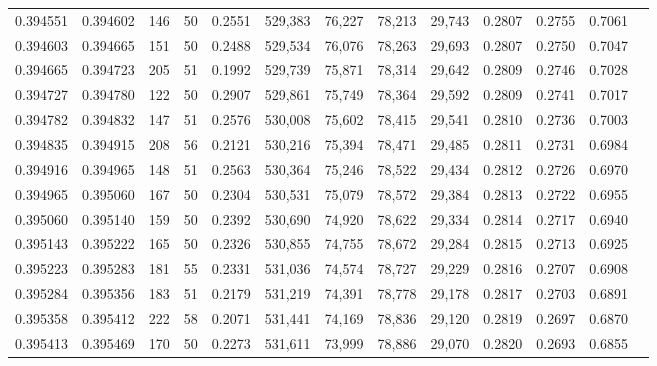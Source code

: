 \begin{tabular}{rrrrrrrrrrrrr}
0.394551 & 0.394602 &   146 &  50 &                                     0.2551 & 529,383 &  76,227 &  78,213 &  29,743 & 0.2807 & 0.2755 & 0.7061 \\
0.394603 & 0.394665 &   151 &  50 &                                     0.2488 & 529,534 &  76,076 &  78,263 &  29,693 & 0.2807 & 0.2750 & 0.7047 \\
0.394665 & 0.394723 &   205 &  51 &                                     0.1992 & 529,739 &  75,871 &  78,314 &  29,642 & 0.2809 & 0.2746 & 0.7028 \\
0.394727 & 0.394780 &   122 &  50 &                                     0.2907 & 529,861 &  75,749 &  78,364 &  29,592 & 0.2809 & 0.2741 & 0.7017 \\
0.394782 & 0.394832 &   147 &  51 &                                     0.2576 & 530,008 &  75,602 &  78,415 &  29,541 & 0.2810 & 0.2736 & 0.7003 \\
0.394835 & 0.394915 &   208 &  56 &                                     0.2121 & 530,216 &  75,394 &  78,471 &  29,485 & 0.2811 & 0.2731 & 0.6984 \\
0.394916 & 0.394965 &   148 &  51 &                                     0.2563 & 530,364 &  75,246 &  78,522 &  29,434 & 0.2812 & 0.2726 & 0.6970 \\
0.394965 & 0.395060 &   167 &  50 &                                     0.2304 & 530,531 &  75,079 &  78,572 &  29,384 & 0.2813 & 0.2722 & 0.6955 \\
0.395060 & 0.395140 &   159 &  50 &                                     0.2392 & 530,690 &  74,920 &  78,622 &  29,334 & 0.2814 & 0.2717 & 0.6940 \\
0.395143 & 0.395222 &   165 &  50 &                                     0.2326 & 530,855 &  74,755 &  78,672 &  29,284 & 0.2815 & 0.2713 & 0.6925 \\
0.395223 & 0.395283 &   181 &  55 &                                     0.2331 & 531,036 &  74,574 &  78,727 &  29,229 & 0.2816 & 0.2707 & 0.6908 \\
0.395284 & 0.395356 &   183 &  51 &                                     0.2179 & 531,219 &  74,391 &  78,778 &  29,178 & 0.2817 & 0.2703 & 0.6891 \\
0.395358 & 0.395412 &   222 &  58 &                                     0.2071 & 531,441 &  74,169 &  78,836 &  29,120 & 0.2819 & 0.2697 & 0.6870 \\
0.395413 & 0.395469 &   170 &  50 &                                     0.2273 & 531,611 &  73,999 &  78,886 &  29,070 & 0.2820 & 0.2693 & 0.6855 \\

\end{tabular}
